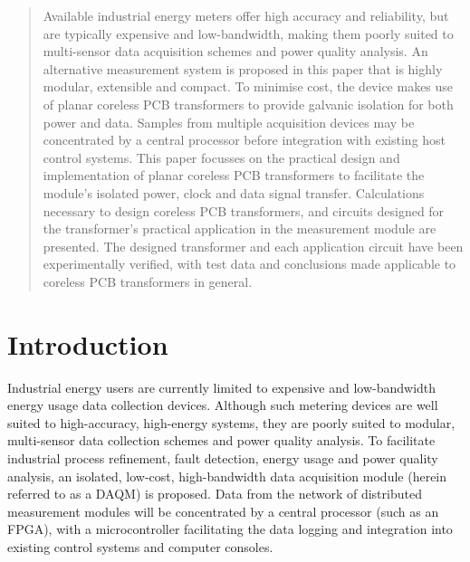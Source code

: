 \documentclass[conference]{IEEEtran}
\begin{document}
\begin{abstract}
Available industrial energy meters offer high accuracy and reliability, but are typically expensive and low-bandwidth, making them poorly suited to multi-sensor data acquisition schemes and power quality analysis.  An alternative measurement system is proposed in this paper that is highly modular, extensible and compact.  To minimise cost, the device makes use of planar coreless PCB transformers to provide galvanic isolation for both power and data. Samples from multiple acquisition devices may be concentrated by a central processor before integration with existing host control systems. This paper focusses on the practical design and implementation of planar coreless PCB transformers to facilitate the module's isolated power, clock and data signal transfer.  Calculations necessary to design coreless PCB transformers, and circuits designed for the transformer's practical application in the measurement module are presented.  The designed transformer and each application circuit have been experimentally verified, with test data and conclusions made applicable to coreless PCB transformers in general.
\end{abstract}


\IEEEpeerreviewmaketitle

\section{Introduction}
Industrial energy users are currently limited to expensive and low-bandwidth energy usage data collection devices. Although such metering devices are well suited to high-accuracy, high-energy systems, they are poorly suited to modular, multi-sensor data collection schemes and power quality analysis.  To facilitate industrial process refinement, fault detection, energy usage and power quality analysis, an isolated, low-cost, high-bandwidth data acquisition module (herein referred to as a DAQM) is proposed.  Data from the network of distributed measurement modules will be concentrated by a central processor (such as an FPGA), with a microcontroller facilitating the data logging and integration into existing control systems and computer consoles.
\end{document}
